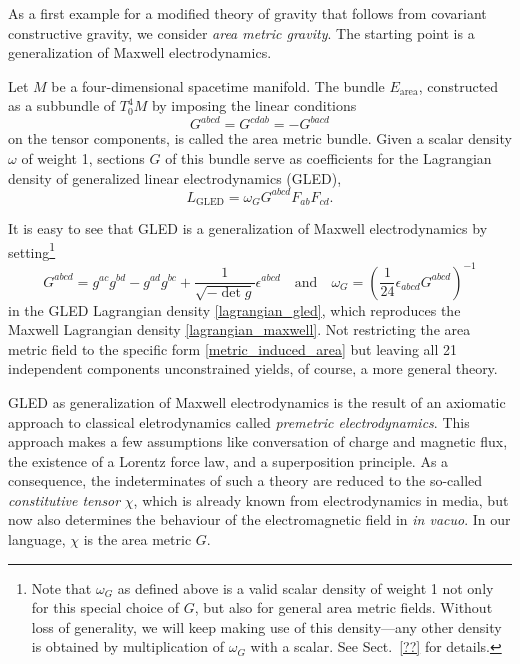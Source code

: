 As a first example for a modified theory of gravity that follows from covariant constructive gravity, we consider \emph{area metric gravity}. The starting point is a generalization of Maxwell electrodynamics.
\begin{definition}\label{def_gled}
  Let $M$ be a four-dimensional spacetime manifold. The bundle $E_\text{area}$, constructed as a subbundle of $T^4_0M$ by imposing the linear conditions
  \begin{equation}
    G^{abcd} = G^{cdab} = -G^{bacd}
  \end{equation}
  on the tensor components, is called the area metric bundle. Given a scalar density $\omega$ of weight 1, sections $G$ of this bundle serve as coefficients for the Lagrangian density of generalized linear electrodynamics (GLED),
  \begin{equation}\label{lagrangian_gled}
    L_\text{GLED} = \omega_G G^{abcd} F_{ab} F_{cd}.
  \end{equation}
\end{definition}
It is easy to see that GLED is a generalization of Maxwell electrodynamics by setting\footnote{Note that $\omega_G$ as defined above is a valid scalar density of weight 1 not only for this special choice of $G$, but also for general area metric fields. Without loss of generality, we will keep making use of this density---any other density is obtained by multiplication of $\omega_G$ with a scalar. See Sect.~\ref{??} for details.}
\begin{equation}\label{metric_induced_area}
  G^{abcd} = g^{ac} g^{bd} - g^{ad} g^{bc} + \frac{1}{\sqrt{-\operatorname{det}g}} \epsilon^{abcd}\quad\text{and}\quad \omega_G = \left(\frac{1}{24}\epsilon_{abcd}G^{abcd}\right)^{-1}
\end{equation}
in the GLED Lagrangian density \eqref{lagrangian_gled}, which reproduces the Maxwell Lagrangian density \eqref{lagrangian_maxwell}. Not restricting the area metric field to the specific form \eqref{metric_induced_area} but leaving all 21 independent components unconstrained yields, of course, a more general theory.

GLED as generalization of Maxwell electrodynamics is the result of an axiomatic approach to classical eletrodynamics called \emph{premetric electrodynamics}\cite{hehl}. This approach makes a few assumptions like conversation of charge and magnetic flux, the existence of a Lorentz force law, and a superposition principle. As a consequence, the indeterminates of such a theory are reduced to the so-called \emph{constitutive tensor} $\chi$, which is already known from electrodynamics in media, but now also determines the behaviour of the electromagnetic field in \emph{in vacuo}. In our language, $\chi$ is the area metric $G$.

